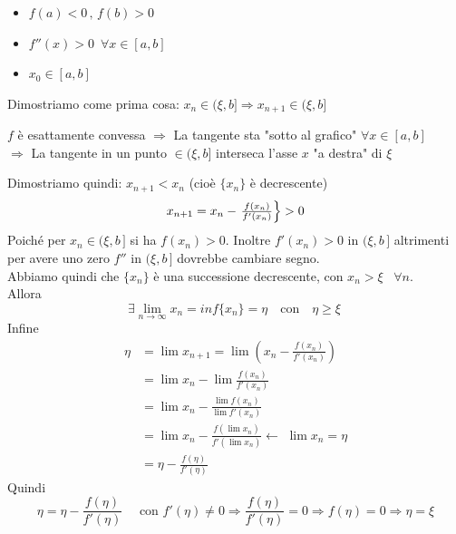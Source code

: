 \begin{itemize}
	\item $f(a)<0\,,\, f(b)>0$
	\item $f''(x)>0\,\,\, \forall x\in [a,b]$
	\item $x_0\in [a,b]$
\end{itemize}
Dimostriamo come prima cosa: $x_n\in (\xi,b] \Rightarrow x_{n+1}\in (\xi,b]$
\begin{center}
	$f$ è esattamente convessa $\Rightarrow$ La tangente sta "sotto al grafico" $\forall x\in [a,b]$ \\$\Rightarrow $ La tangente in un punto $\in (\xi,b]$ interseca l'asse $x$ "a destra" di $\xi$
\end{center}
Dimostriamo quindi: $x_{n+1}<x_n$ (cioè $\{x_n\}$ è decrescente) 
\[
x_{n+1} = x_n - 
\begin{rcases}
\frac{f(x_n)}{f'(x_n)}
\end{rcases}
>0
\]
Poiché per $x_n \in (\xi,b\,]$ si ha $f(x_n)>0$. Inoltre $f'(x_n)>0$ in $(\xi,b\,]$ altrimenti per avere uno zero $f''$ in $(\xi,b\,]$ dovrebbe cambiare segno.\\
Abbiamo quindi che $\{x_n\}$ è una successione decrescente, con $x_n>\xi \,\,\,\,\, \forall n$.\\
Allora
\[
\exists \lim_{n \to \infty} x_n = inf\{x_n\} = \eta \quad \text{con} \quad \eta \geq \xi\
\]
Infine
\[
\begin{split}
\eta & = \lim x_{n+1} = \lim \left( x_n - \frac{f(x_n)}{f'(x_n)} \right) \\
& = \lim x_n - \lim\frac{f(x_n)}{f'(x_n)} \\
& = \lim x_n - \frac{\lim f(x_n)}{\lim f'(x_n)} \\ 
& = \lim x_n - \frac{f(\lim x_n)}{f'(\lim x_n)} \leftarrow \,\, \lim x_n=\eta\\
& = \eta - \frac{f(\eta)}{f'(\eta)}
\end{split}
\]
Quindi
\[\eta=\eta-\frac{f(\eta)}{f'(\eta)} \quad \text{ con } f'(\eta) \neq 0 \Rightarrow \frac{f(\eta)}{f'(\eta)} = 0 \Rightarrow f(\eta)=0 \Rightarrow \eta=\xi\]




